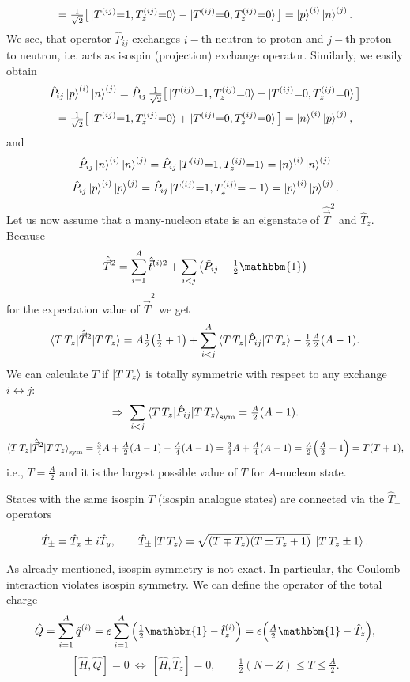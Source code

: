 \documentclass[11pt,a4paper]{article}
\newcommand{\op}[1]{\hat{#1}}
\begin{document}
\[
=\tfrac{1}{\sqrt2}\big[\ket{T^{(ij)}{=}1,T^{(ij)}_z{=}0}-\ket{T^{(ij)}{=}0,T^{(ij)}_z{=}0}\big]=\ket p^{(i)}\ket n^{(j)}.
\]
We see, that operator $\op P_{ij}$ exchanges $i-$th neutron to proton and $j-$th proton to neutron, i.e. acts as isospin (projection) exchange operator. 
Similarly, we easily obtain 
\[
\op P_{ij}\ket p^{(i)}\ket n^{(j)}
=\op P_{ij}\,\tfrac{1}{\sqrt2}\big[\ket{T^{(ij)}{=}1,T^{(ij)}_z{=}0}-\ket{T^{(ij)}{=}0,T_z^{(ij)}{=}0}\big]
\]
\[
=\tfrac{1}{\sqrt2}\big[\ket{T^{(ij)}{=}1,T^{(ij)}_z{=}0}+\ket{T^{(ij)}{=}0,T^{(ij)}_z{=}0}\big]=\ket n^{(i)}\ket p^{(j)}, 
\]
and 
\[
\op P_{ij}\ket n^{(i)}\ket n^{(j)}=\op P_{ij}\ket{T^{(ij)}{=}1,T_z^{(ij)}{=}1}=\ket n^{(i)}\ket n^{(j)}
\]
\[
\op P_{ij}\ket p^{(i)}\ket p^{(j)}=\op P_{ij}\ket{T^{(ij)}{=}1,T_z^{(ij)}{=}-1}=\ket p^{(i)}\ket p^{(j)}.
\]
Let us now assume that a many-nucleon state is an eigenstate of ${\op {\vec T}^2}$ and 
${\op T_z}$. Because 
\[
\op {\vec T}^2=\sum_{i=1}^A \op{\vec t}^{(i)2}+\sum_{i<j}\big(\op P_{ij}-\tfrac12 \mathbbm{1}\big)
\] for the expectation value of ${\op {\vec T}^2}$ we get 
\[
\braket{T\,T_z|\op {\vec T}^2|T\,T_z}
= A\tfrac12\big(\tfrac12+1\big)+\sum_{i<j}^{A}\braket{T\,T_z|\op P_{ij}|T\,T_z}
-\tfrac12\tfrac{A}{2}(A-1).
\]
We can calculate $T$ if $\ket{T\,T_z}$ is totally symmetric with respect to
any exchange $i\leftrightarrow j$:
\[
\Rightarrow\ \sum_{i<j}\braket{T\,T_z|\op P_{ij}|T\,T_z}_{\rm sym}=\tfrac{A}{2}(A-1) .
\]
\[
\braket{T\,T_z|\op {\vec T}^2|T\,T_z}_{\rm sym}
=\tfrac34 A+\tfrac{A}{2}(A-1)-\tfrac{A}{4}(A-1)
=\tfrac34 A+\tfrac{A}{4}(A-1)=\tfrac{A}{2}\Big(\tfrac{A}{2}+1\Big)=T(T+1),
\]
i.e., $T=\frac{A}{2}$ and it is the largest possible value of $T$ for $A$-nucleon state. 

States with the same isospin $T$ (isospin analogue states) are connected via the $\op T_\pm$ operators

\[
\op T_\pm=\op T_x\pm i\op T_y, \qquad
\op T_\pm\ket{T\,T_z}=\sqrt{(T\mp T_z)(T\pm T_z+1)}\;\ket{T\,T_z\pm1}.
\]


\par
As already mentioned, isospin symmetry is not exact. In particular, the Coulomb interaction violates isospin symmetry. We can define the operator of the total charge
\[
\op Q=\sum_{i=1}^A \op q^{(i)}=e\sum_{i=1}^A\Big(\tfrac12 \mathbbm{1} -\op t_z^{(i)}\Big)
=e\Big(\tfrac{A}{2} \mathbbm{1} -\op T_z\Big),
\]
\[
[\op H,\op Q]=0 \ \Longleftrightarrow\ [\op H,\op T_z]=0,
\qquad
\tfrac12(N-Z)\le T\le \tfrac{A}{2}.
\]
\end{document}
